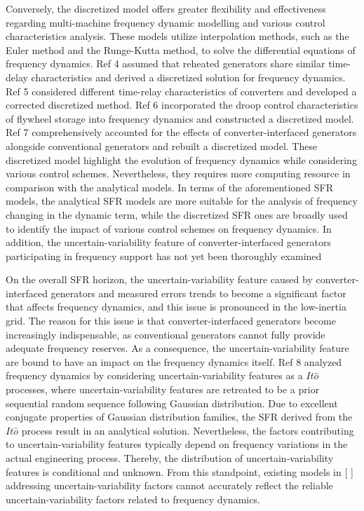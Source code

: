 \documentclass[lettersize,journal]{IEEEtran}
\begin{document}
Conversely, the discretized model offers greater flexibility and effectiveness regarding multi-machine frequency dynamic modelling and various control characteristics analysis.  These models utilize interpolation methods, such as the Euler method and the Runge-Kutta method, to solve the differential equations of frequency dynamics.  Ref 4 assumed that reheated generators share similar time-delay characteristics and derived a discretized solution for  frequency dynamics.  Ref 5 considered different time-relay characteristics of converters and developed a corrected discretized method. Ref 6 incorporated the droop control characteristics of flywheel storage into frequency dynamics and constructed a discretized model. Ref 7 comprehensively accounted for the effects of converter-interfaced generators alongside conventional generators and rebuilt a discretized model. These discretized model highlight the evolution of frequency dynamics while considering various control schemes.
Nevertheless, they requires more computing resource in comparison with the analytical models. In terms of the aforementioned SFR models, the analytical SFR models are more suitable for the analysis of frequency changing in the dynamic term, while the discretized SFR ones are broadly used to identify the impact of various control schemes on frequency dynamics. In addition, the uncertain-variability feature of converter-interfaced generators participating in frequency support has not yet been thoroughly examined

On the overall SFR horizon, the uncertain-variability feature caused by converter-interfaced generators and measured errors trends to become a significant factor that affects frequency dynamics, and this issue is pronounced in the low-inertia grid. The reason for this issue is that converter-interfaced generators become increasingly indispensable, as conventional generators cannot fully provide adequate frequency reserves. As a consequence, the uncertain-variability feature are bound to have an impact on the frequency dynamics itself.  Ref 8 analyzed frequency dynamics by considering uncertain-variability features as a \(It\widehat{o}\) processes, where uncertain-variability features are retreated to be a prior sequential random sequence following Gaussian distribution. Due to excellent conjugate properties of Gaussian distribution families, the SFR derived from the \(It\widehat{o}\) process result in an analytical solution.  Nevertheless, the factors contributing to uncertain-variability features typically depend on frequency variations in the actual engineering process. Thereby, the distribution of uncertain-variability features is conditional and unknown. From this standpoint, existing models in [ ] addressing uncertain-variability factors cannot accurately reflect the reliable uncertain-variability factors related to frequency dynamics.
\end{document}
